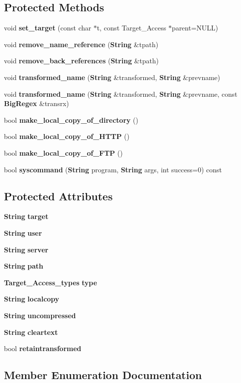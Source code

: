 \subsection*{Protected Methods}
\begin{CompactItemize}
\item 
void {\bf set\_\-target} (const char $\ast$t, const Target\_\-Access $\ast$parent=NULL)
\item 
void {\bf remove\_\-name\_\-reference} ({\bf String} \&tpath)
\item 
void {\bf remove\_\-back\_\-references} ({\bf String} \&tpath)
\item 
void {\bf transformed\_\-name} ({\bf String} \&transformed, {\bf String} \&prevname)
\item 
void {\bf transformed\_\-name} ({\bf String} \&transformed, {\bf String} \&prevname, const {\bf Big\-Regex} \&transrx)
\item 
bool {\bf make\_\-local\_\-copy\_\-of\_\-directory} ()
\item 
bool {\bf make\_\-local\_\-copy\_\-of\_\-HTTP} ()
\item 
bool {\bf make\_\-local\_\-copy\_\-of\_\-FTP} ()
\item 
bool {\bf syscommand} ({\bf String} program, {\bf String} args, int success=0) const
\end{CompactItemize}
\subsection*{Protected Attributes}
\begin{CompactItemize}
\item 
{\bf String} {\bf target}
\item 
{\bf String} {\bf user}
\item 
{\bf String} {\bf server}
\item 
{\bf String} {\bf path}
\item 
{\bf Target\_\-Access\_\-types} {\bf type}
\item 
{\bf String} {\bf localcopy}
\item 
{\bf String} {\bf uncompressed}
\item 
{\bf String} {\bf cleartext}
\item 
bool {\bf retaintransformed}
\end{CompactItemize}


\subsection{Member Enumeration Documentation}
